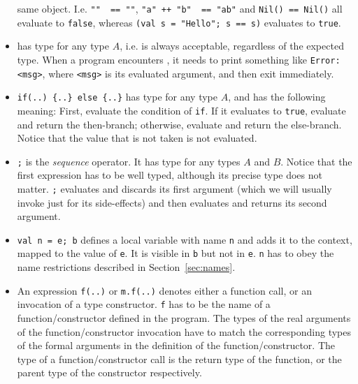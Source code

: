 \begin{itemize}
        same object.
        I.e. \hbox{\lstinline{""}\ \lstinline{ == ""}},
        \hbox{\lstinline{"a"}\ \lstinline{++ "b"}\ \lstinline{ == "ab"}} and
        \hbox{\lstinline{Nil() == Nil()}} all evaluate to \lstinline{false},
        whereas \hbox{\lstinline{(val s = "Hello"; s == s)}} evaluates to \lstinline{true}.
    \item {} has type  for any type $A$, i.e.  is always acceptable,
        regardless of the expected type. When a program encounters , it needs to print
        something like \lstinline{Error: <msg>}, where \lstinline{<msg>} is its evaluated argument,
        and then exit immediately.
    \item \lstinline|if(..) {..} else {..}| has type  for any type $A$,
        and has the following meaning:
        First, evaluate the condition of \lstinline{if}. If it evaluates to \lstinline{true},
        evaluate and return the then-branch; otherwise, evaluate and return the else-branch.
        Notice that the value that is not taken is not evaluated.
    \item \lstinline{;} is the \emph{sequence} operator. It has type
         for any types $A$ and $B$.
        Notice that the first expression has to be well typed, although its precise type does not matter.
        \lstinline{;} evaluates and discards its first argument
        (which we will usually invoke just for its side-effects)
        and then evaluates and returns its second argument.
    \item \lstinline{val n = e; b} defines a local variable with name \lstinline{n} and
        adds it to the context, mapped to the value of \lstinline{e}.
        It is visible in \lstinline{b} but not in \lstinline{e}.
        \lstinline{n} has to obey the name restrictions described in Section~\ref{sec:names}.
    \item An expression \lstinline{f(..)} or \lstinline{m.f(..)} denotes either a function call,
        or an invocation of a type constructor.
        \lstinline{f} has to be the name of a function/constructor defined in the program.
        The types of the real arguments of the function/constructor invocation have to match
        the corresponding types of the formal arguments in the definition of the function/constructor.
        The type of a function/constructor call is the return type of the function,
        or the parent type of the constructor respectively.


\end{itemize}
